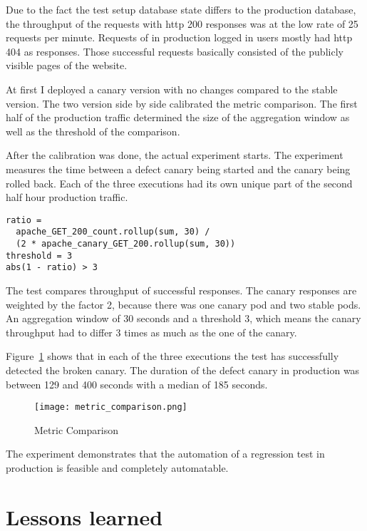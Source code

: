 Due to the fact the test setup database state differs to the production database, the
throughput of the requests with http 200 responses was at the low rate of 25 requests per
minute. Requests of in production logged in users mostly had http 404 as responses. Those
successful requests basically consisted of the publicly visible pages of the website.

At first I deployed a canary version with no changes compared to the stable version. The
two version side by side calibrated the metric comparison. The first half of the
production traffic determined the size of the aggregation window as well as the threshold
of the comparison.

After the calibration was done, the actual experiment starts. The experiment measures the
time between a defect canary being started and the canary being rolled back. Each
of the three executions had its own unique part of the second half hour production traffic.

\begin{verbatim}
ratio =
  apache_GET_200_count.rollup(sum, 30) /
  (2 * apache_canary_GET_200.rollup(sum, 30))
threshold = 3
abs(1 - ratio) > 3
\end{verbatim}

The test compares throughput of successful responses. The canary responses are weighted by
the factor 2, because there was one canary pod and two stable pods. An aggregation window
of 30 seconds and a threshold 3, which means the canary throughput had to differ 3 times
as much as the one of the canary.

Figure~\ref{fig:metric_comparison} shows that in each of the three executions the test has
successfully detected the broken canary. The duration of the defect canary in production
was between 129 and 400 seconds with a median of 185 seconds.

\begin{figure}[htbp]
  \centering
  \texttt{[image: metric\_comparison.png]}
  \caption[Metric Comparison]{Metric Comparison}
  \label{fig:metric_comparison}
\end{figure}

The experiment demonstrates that the automation of a regression test in production is
feasible and completely automatable.

\section{Lessons learned}

